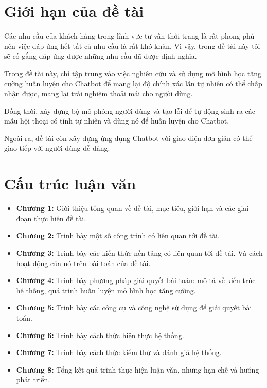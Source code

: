 

\section{Giới hạn của đề tài}
\label{sec:scope}
Các nhu cầu của khách hàng trong lĩnh vực tư vấn thời trang là rất phong phú nên việc đáp ứng hết tất cả nhu cầu là rất khó khăn. Vì vậy, trong đề tài này tôi sẽ cố gắng đáp ứng được những nhu cầu đã được định nghĩa.

Trong đề tài này, chỉ tập trung vào việc nghiên cứu và sử dụng mô hình học tăng cường huấn luyện cho Chatbot để mang lại độ chính xác lẫn tự nhiên có thể chấp nhận được, mang lại trải nghiệm thoải mái cho người dùng.

Đồng thời, xây dựng bộ mô phỏng người dùng và tạo lỗi để tự động sinh ra các mẫu hội thoại có tính tự nhiên và dùng nó để huấn luyện cho Chatbot.

Ngoài ra, đề tài còn xây dựng ứng dụng Chatbot với giao diện đơn giản có thể giao tiếp với người dùng dễ dàng.

\section{Cấu trúc luận văn}

\begin{itemize}
    \item \textbf{Chương 1:} Giới thiệu tổng quan về đề tài, mục tiêu, giới hạn và các giai đoạn thực hiện đề tài.
    \item \textbf{Chương 2:} Trình bày một số công trình có liên quan tới đề tài.
    \item \textbf{Chương 3:} Trình bày các kiến thức nền tảng có liên quan tới đề tài. Và cách hoạt động của nó trên bài toán của đề tài.
    \item \textbf{Chương 4:} Trình bày phương pháp giải quyết bài toán: mô tả về kiến trúc hệ thống, quá trình huấn luyện mô hình học tăng cường.
    \item \textbf{Chương 5:} Trình bày các công cụ và công nghệ sử dụng để giải quyết bài toán.
    \item \textbf{Chương 6:} Trình bày cách thức hiện thực hệ thống.
    \item \textbf{Chương 7:} Trình bày cách thức kiểm thử và đánh giá hệ thống.
    \item \textbf{Chương 8:} Tổng kết quá trình thực hiện luận văn, những hạn chế và hướng phát triển.
\end{itemize}
